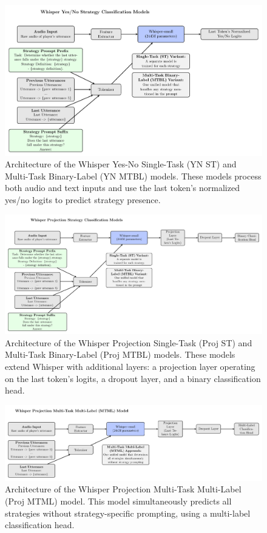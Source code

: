 \documentclass{article}
\begin{document}
\begin{figure}[H]
    \centering
    \includegraphics[width=\textwidth]{figures/pdf/whisper_yn_st_and_mtbl.pdf}
    \caption{Architecture of the Whisper Yes-No Single-Task (YN ST) and Multi-Task Binary-Label (YN MTBL) models. These models process both audio and text inputs and use the last token's normalized yes/no logits to predict strategy presence.}
    \label{fig:whisper_yn_st_and_mtbl}
\end{figure}

\begin{figure}[H]
    \centering
    \includegraphics[width=\textwidth]{figures/pdf/whisper_proj_st_and_mtbl.pdf}
    \caption{Architecture of the Whisper Projection Single-Task (Proj ST) and Multi-Task Binary-Label (Proj MTBL) models. These models extend Whisper with additional layers: a projection layer operating on the last token's logits, a dropout layer, and a binary classification head.}
    \label{fig:whisper_proj_st_and_mtbl}
\end{figure}

\begin{figure}[H]
    \centering
    \includegraphics[width=\textwidth]{figures/pdf/whisper_proj_mtml.pdf}
    \caption{Architecture of the Whisper Projection Multi-Task Multi-Label (Proj MTML) model. This model simultaneously predicts all strategies without strategy-specific prompting, using a multi-label classification head.}
    \label{fig:whisper_proj_mtml}
\end{figure}
\end{document}
